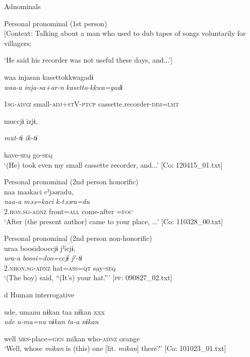 \begin{table}
\ea\label{ex:6-105}
  Adnominals

 \ea Personal pronominal (1st person)\\{}
[Context: Talking about a man who used to dub tapes of songs voluntarily for villagers;

{\TM} ‘He said his recorder was not useful these days, and...’]

{\TM}
\glll waa  injasan  {\textbar}kasetto{\textbar}kkwagadɨ\\

      \textit{waa-a}  \textit{inja-sa+ar-n}\textsubscript{} \textit{kasetto-kkwa=gadɨ}

      1\textsc{sg}-\textsc{adnz}  small-\textsc{adj}+\textsc{st}V-\textsc{ptcp}  cassette.recorder-\textsc{dim}=\textsc{lmt}

      muccjɨ  izjɨ,

      \textit{mut-tɨ}  \textit{ik-tɨ}

      have-\textsc{seq}  go-\textsc{seq}\\
\glt ‘(He) took even my small cassette recorder, and...’ [Co: 120415\_01.txt]
\z

\ex Personal pronominal (2nd person honorific)\\
{\TM}
\glll  naa  məəkaci  cˀjəəradu,\\
\textit{naa-a}  \textit{məə=kaci}  \textit{k-təəra=du}\\
2.\textsc{hon}.\textsc{sg}-\textsc{adnz}  front=\textsc{all}  come-after =\textsc{foc}\\
\glt ‘After (the present author) came to your place, ...’ [Co: 110328\_00.txt]
\z

\ex Personal pronominal (2nd person non-honorific)\\
{\TM}
\glll  uraa  {\textbar}boosi{\textbar}dooccjɨ  jˀicjɨ,\\
\textit{ura-a}  \textit{boosi=doo=ccjɨ}  \textit{jˀ-tɨ}\\
2.\textsc{nhon}.\textsc{sg}-\textsc{adnz}  hat=\textsc{ass}=\textsc{qt}  say-\textsc{seq}\\
\glt ‘(The boy) said, “(It’s) your hat.”’ [\textsc{pf}: 090827\_02.txt]
\z

  d  Human interrogative

{\TM}
\glll ude,  umanu  nɨkan  taa  nɨkan  xxx\\

      \textit{ude}  \textit{u-ma=nu}  \textit{nɨkan}  \textit{ta-a}  \textit{nɨkan}  

      well  \textsc{mes}-place=\textsc{gen}  mikan  who-\textsc{adnz}  orange\\
\glt ‘Well, whose \textit{mikan} is (this) one [lit. \textit{mikan}] there?’ [Co: 101023\_01.txt]
\z


\end{table}
